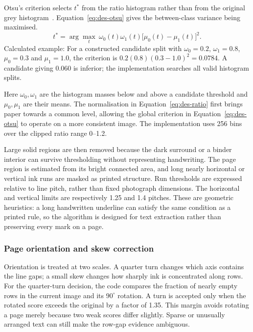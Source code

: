 Otsu's criterion selects $t^*$ from the ratio histogram rather than from the original grey histogram~\cite[page to verify]{otsu1979}. Equation~\ref{eq:des-otsu} gives the between-class variance being maximised.
\begin{equation}
t^*=\arg\max_t\ \omega_0(t)\omega_1(t)
\bigl[\mu_0(t)-\mu_1(t)\bigr]^2.
\label{eq:des-otsu}
\end{equation}
Calculated example: For a constructed candidate split with $\omega_0=0.2$, $\omega_1=0.8$, $\mu_0=0.3$ and $\mu_1=1.0$, the criterion is $0.2(0.8)(0.3-1.0)^2=0.0784$. A candidate giving 0.060 is inferior; the implementation searches all valid histogram splits. \cite[segment.py, Otsu]{braunepipeline2026}

Here $\omega_0,\omega_1$ are the histogram masses below and above a candidate threshold and $\mu_0,\mu_1$ are their means. The normalisation in Equation~\ref{eq:des-ratio} first brings paper towards a common level, allowing the global criterion in Equation~\ref{eq:des-otsu} to operate on a more consistent image. The implementation uses 256 bins over the clipped ratio range 0--1.2.~\cite[segment.py]{braunepipeline2026}

Large solid regions are then removed because the dark surround or a binder interior can survive thresholding without representing handwriting. The page region is estimated from its bright connected area, and long nearly horizontal or vertical ink runs are masked as printed structure. Run thresholds are expressed relative to line pitch, rather than fixed photograph dimensions. The horizontal and vertical limits are respectively 1.25 and 1.4 pitches. These are geometric heuristics: a long handwritten underline can satisfy the same condition as a printed rule, so the algorithm is designed for text extraction rather than preserving every mark on a page.~\cite[segment.py]{braunepipeline2026}

\subsubsection{Page orientation and skew correction}
Orientation is treated at two scales. A quarter turn changes which axis contains the line gaps; a small skew changes how sharply ink is concentrated along rows. For the quarter-turn decision, the code compares the fraction of nearly empty rows in the current image and its $90^\circ$ rotation. A turn is accepted only when the rotated score exceeds the original by a factor of 1.35. This margin avoids rotating a page merely because two weak scores differ slightly. Sparse or unusually arranged text can still make the row-gap evidence ambiguous.~\cite[segment.py]{braunepipeline2026}


